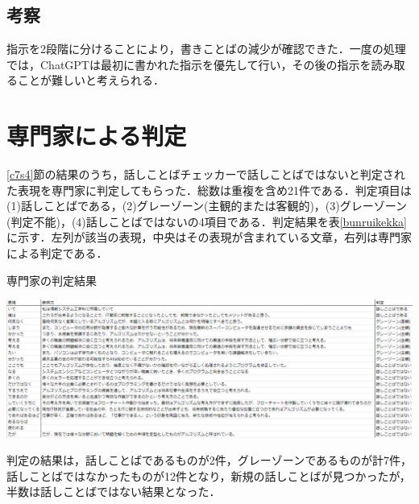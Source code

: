 \subsection{考察}
指示を2段階に分けることにより，書きことばの減少が確認できた．一度の処理では，ChatGPTは最初に書かれた指示を優先して行い，その後の指示を読み取ることが難しいと考えられる．

\section{専門家による判定}
\ref{c7s4}節の結果のうち，話しことばチェッカーで話しことばではないと判定された表現を専門家に判定してもらった．総数は重複を含め21件である．判定項目は(1)話しことばである，(2)グレーゾーン(主観的または客観的)，(3)グレーゾーン(判定不能)，(4)話しことばではないの4項目である．判定結果を表\ref{bunruikekka}に示す．左列が該当の表現，中央はその表現が含まれている文章，右列は専門家による判定である．

\begin{table}[H]
	\centering
        \caption{専門家の判定結果}
 	\includegraphics[width=150mm]{image/result-bunruikekka.png}
	\label{bunruikekka}
\end{table}

判定の結果は，話しことばであるものが2件，グレーゾーンであるものが計7件，話しことばではなかったものが12件となり，新規の話しことばが見つかったが，半数は話しことばではない結果となった．